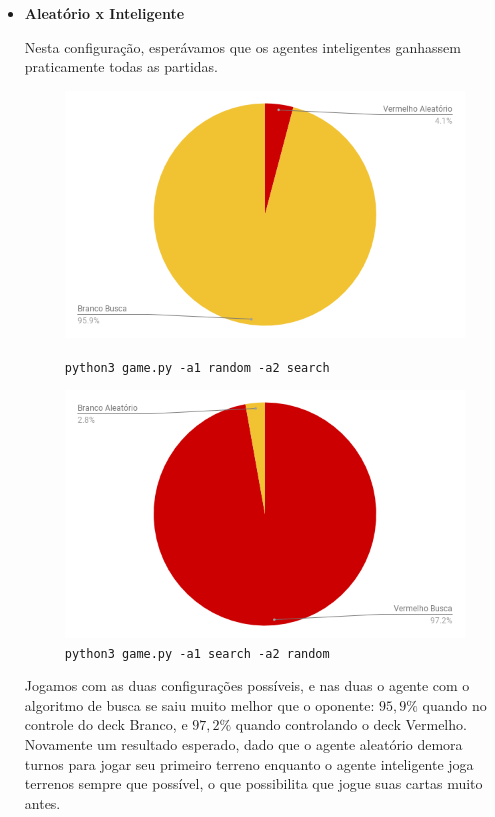 \begin{itemize}
\item \textbf{Aleatório x Inteligente}

Nesta configuração, esperávamos que os agentes inteligentes ganhassem praticamente todas as partidas.

\begin{figure}[!h]
\centering
\begin{minipage}{.4\textwidth}
  \centering
  \includegraphics[width=\linewidth]{picstcc/rase.png}
  \caption{\texttt{python3 game.py -a1 random -a2 search}}
  \label{rase}
\end{minipage}
\hspace{1cm}
\begin{minipage}{.4\textwidth}
  \centering
  \includegraphics[width=\linewidth]{picstcc/sera.png}
  \caption{\texttt{python3 game.py -a1 search -a2 random}}
  \label{sera}
\end{minipage}
\end{figure}

Jogamos com as duas configurações possíveis, e nas duas o agente com o algoritmo de busca se saiu
muito melhor que o oponente: $95,9\%$ quando no controle do deck Branco, e $97,2\%$ quando controlando o deck Vermelho. Novamente um resultado esperado, dado que o agente aleatório demora turnos para jogar seu primeiro terreno enquanto o agente inteligente joga terrenos sempre que possível, o que possibilita que jogue suas cartas muito antes.


\end{itemize}
